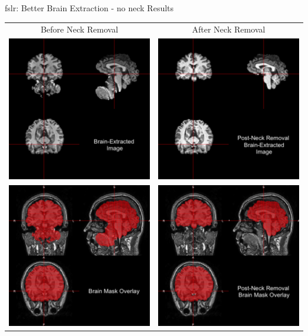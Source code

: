 \documentclass[11pt]{beamer}\usepackage[]{graphicx}\usepackage[]{color}
\begin{document}
\begin{frame}[fragile]{fslr: Better Brain Extraction - no neck Results}

\begin{tabular}{cc}
Before Neck Removal & After Neck Removal \\
\includegraphics[width=0.4\linewidth]{BET_Image.png} & \includegraphics[width=0.4\linewidth]{BET_Image3.png} \\
\includegraphics[width=0.4\linewidth]{BET_Image_Overlay.png} & \includegraphics[width=0.4\linewidth]{BET_Image_Overlay3.png}
\end{tabular}

\end{frame}
\end{document}
